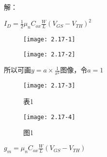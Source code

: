 






解：

\scalebox{3}{（a）}

$I_D=\frac{1}{2}\mu_nC_{ox}\frac{W}{L}(V_{GS}-V_{TH})^2$




\begin{figure}[H] %
	\begin{minipage}{\linewidth}
		\texttt{[image: 2.17-1]}
	\end{minipage}
\end{figure}


\begin{figure}[H] %
	\begin{minipage}{\linewidth}
		\texttt{[image: 2.17-2]}
	\end{minipage}
\end{figure}







所以可画$y=a\times \frac{1}{x^2}$图像，令$a=1$

		\begin{figure}[H] %
	\begin{minipage}{\linewidth}
		\texttt{[image: 2.17-3]}
	\end{minipage}
	\caption*{表1} %
\end{figure}

		\begin{figure}[H] %
	\begin{minipage}{\linewidth}
		\texttt{[image: 2.17-4]}
	\end{minipage}
	\caption*{图1} %
\end{figure}










\scalebox{3}{（b）}

$g_m=\mu_nC_{ox}\frac{W}{L}(V_{GS}-V_{TH})$


